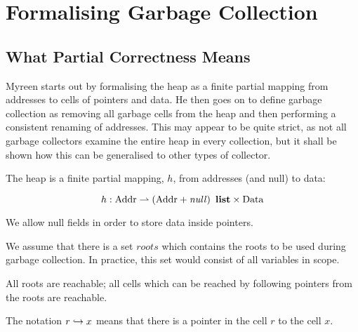 \chapter{Formalising Garbage Collection}

\section{What Partial Correctness Means}

Myreen starts out by formalising the \gls{heap} as a finite partial
mapping from addresses to \glspl{cell} of \glspl{pointer} and
\gls{data}. He then goes on to define garbage collection as removing
all \gls{garbage} \glspl{cell} from the \gls{heap} and then performing
a consistent renaming of addresses\cite{Myreen10}. This may appear to
be quite strict, as not all \glspl{garbage collector} examine the
entire \gls{heap} in every collection, but it shall be shown how this
can be generalised to other types of \gls{collector}.

\begin{definition}[Heap]
  The heap is a finite partial mapping, $h$, from addresses (and null) to data:

  \[h : \addr \finparmap \listof{\left(\addr + \nullp\right)} \x \data\]

  We allow null fields in order to store data inside pointers.
\end{definition}

We assume that there is a set $roots$ which contains the \glspl{root}
to be used during \gls{garbage collection}. In practice, this set
would consist of all variables in scope.

\begin{definition}[Reachable]
  All roots are reachable; all cells which can be reached by following
  pointers from the roots are reachable.

  \begin{minipage}{.5\textwidth}
    \begin{prooftree}
    \end{prooftree}
  \end{minipage}
  \begin{minipage}{.5\textwidth}
    \begin{prooftree}
    \end{prooftree}
  \end{minipage}

  The notation $r \pointsto x$ means that there is a pointer in the
  cell $r$ to the cell $x$.
\end{definition}

